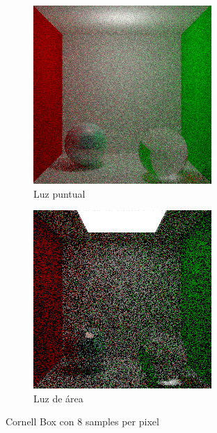 \documentclass{article}
\begin{document}
\begin{figure}[H]
\begin{subfigure}[h]{0.4\linewidth}
\includegraphics[width=\linewidth]{imgs/cosine_box8.png}
\caption{Luz puntual}
\end{subfigure}
\hfill
\begin{subfigure}[h]{0.4\linewidth}
\includegraphics[width=\linewidth]{imgs/area_box8.png}
\caption{Luz de área}
\end{subfigure}%
\caption{Cornell Box con 8 samples per pixel}
\end{figure}
\end{document}
